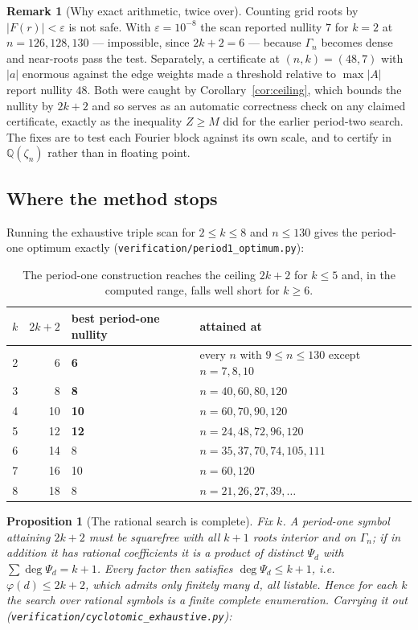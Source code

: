 \documentclass[11pt]{article}
\newtheorem{proposition}[theorem]{Proposition}
\theoremstyle{definition}
\newtheorem{remark}[theorem]{Remark}
\begin{document}
\begin{remark}[Why exact arithmetic, twice over]
Counting grid roots by $|F(r)|<\varepsilon$ is not safe. With
$\varepsilon=10^{-8}$ the scan reported nullity $7$ for $k=2$ at
$n=126,128,130$ --- impossible, since $2k+2=6$ --- because $\Gamma_n$ becomes
dense and near-roots pass the test. Separately, a certificate at
$(n,k)=(48,7)$ with $|a|$ enormous against the edge weights made a threshold
relative to $\max|A|$ report nullity $48$. Both were caught by
Corollary~\ref{cor:ceiling}, which bounds the nullity by $2k+2$ and so serves
as an automatic correctness check on any claimed certificate, exactly as the
inequality $Z\ge M$ did for the earlier period-two search. The fixes are to
test each Fourier block against its own scale, and to certify in
$\mathbb Q(\zeta_n)$ rather than in floating point.
\end{remark}

\subsection*{Where the method stops}
Running the exhaustive triple scan for $2\le k\le8$ and $n\le130$
gives the period-one optimum exactly
(\texttt{verification/period1\_optimum.py}):

\begin{table}[h]\centering
\begin{tabular}{crll}
\toprule
$k$ & $2k+2$ & best period-one nullity & attained at \\
\midrule
2 & 6  & \textbf{6}  & every $n$ with $9\le n\le130$ except $n=7,8,10$ \\
3 & 8  & \textbf{8}  & $n=40,60,80,120$ \\
4 & 10 & \textbf{10} & $n=60,70,90,120$ \\
5 & 12 & \textbf{12} & $n=24,48,72,96,120$ \\
6 & 14 & 8           & $n=35,37,70,74,105,111$ \\
7 & 16 & 10          & $n=60,120$ \\
8 & 18 & 8           & $n=21,26,27,39,\dots$ \\
\bottomrule
\end{tabular}
\caption{The period-one construction reaches the ceiling $2k+2$ for
$k\le5$ and, in the computed range, falls well short for $k\ge6$.}
\end{table}

\begin{proposition}[The rational search is complete]\label{prop:exh}
Fix $k$. A period-one symbol attaining $2k+2$ must be squarefree with all $k+1$
roots interior and on $\Gamma_n$; if in addition it has rational coefficients it
is a product of distinct $\Psi_d$ with $\sum\deg\Psi_d=k+1$. Every factor then
satisfies $\deg\Psi_d\le k+1$, i.e.\ $\varphi(d)\le 2k+2$, which admits only
finitely many $d$, all listable. Hence for each $k$ the search over rational
symbols is a finite complete enumeration. Carrying it out
(\texttt{verification/cyclotomic\_exhaustive.py}):
\end{proposition}
\end{document}
